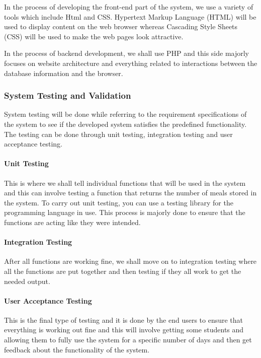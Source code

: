 \documentclass{article}
\begin{document}
In the process of developing the front-end part of the system, we use a variety of tools which include Html and CSS.  Hypertext Markup Language (HTML) will be used to display content on the web browser whereas Cascading Style Sheets (CSS) will be used to make the web pages look attractive. 

In the process of backend development, we shall use PHP and this side majorly focuses on website architecture and everything related to interactions between the database information and the browser. 

\subsubsection{System Testing and Validation}
System testing will be done while referring to the requirement specifications of the system to see if the developed system satisfies the predefined functionality. The testing can be done through unit testing, integration testing and user acceptance testing.

\paragraph{Unit Testing \\}
This is where we shall tell individual functions that will be used in the system and this can involve testing a function that returns the number of meals stored in the system. To carry out unit testing, you can use a testing library for the programming language in use. This process is majorly done to ensure that the functions are acting like they were intended. 

\paragraph{Integration Testing \\}
After all functions are working fine, we shall move on to integration testing where all the functions are put together and then testing if they all work to get the needed output.

\paragraph{User Acceptance Testing \\}
This is the final type of testing and it is done by the end users to ensure that everything is working out fine and this will involve getting some students and allowing them to fully use the system for a specific number of days and then get feedback about the functionality of the system. 
\end{document}
